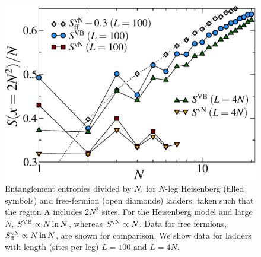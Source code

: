\begin{figure} { \includegraphics[width=6.5in]{./figures/paper1/figure4/fig4.eps}
 \caption[Area Law in 2D Heis model]{
 {\color{red} Entanglement entropies divided by $N$,  for $N$-leg Heisenberg
(filled symbols) and free-fermion (open diamonds) ladders, taken such that
the region A includes $2N^2$ sites.  
For the Heisenberg model and large $N$, $S^{\rm VB}\propto N \ln N$,
whereas $S^{\rm vN}\propto N$.  
Data for free fermions, $S^{\rm vN}_{\rm ff}\propto N \ln N$,  are shown for comparison.
We show data for ladders with length (sites per leg) $L =100$ and
$L=4N$.  
}
\label{zigzag}}} 
\end{figure}
